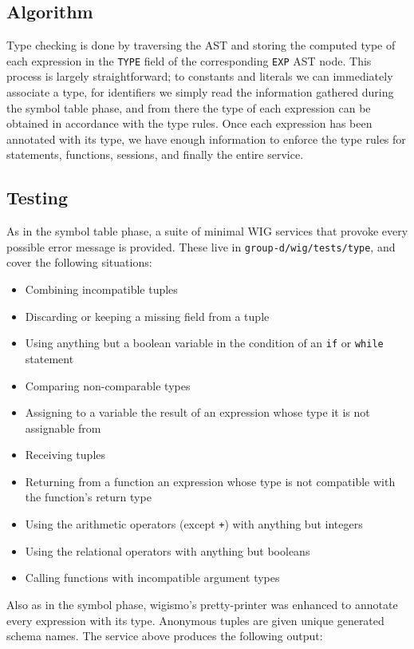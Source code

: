 \documentclass{WigReport}
\begin{document}
\subsection{Algorithm}
Type checking is done by traversing the AST and storing the computed type 
of each expression in the {\tt TYPE} field of the corresponding {\tt EXP}
AST node. This process is largely straightforward; to constants and
literals we can immediately associate a type, for identifiers we simply
read the information gathered during the symbol table phase, and from 
there the type of each expression can be obtained in accordance with the
type rules. Once each expression has been annotated with its type, we have
enough information to enforce the type rules for statements, functions,
sessions, and finally the entire service.

\subsection{Testing}
As in the symbol table phase, a suite of minimal WIG services that provoke
every possible error message is provided. These live in
{\tt group-d/wig/tests/type}, and cover the following situations:

\begin{itemize}
\item Combining incompatible tuples
\item Discarding or keeping a missing field from a tuple
\item Using anything but a boolean variable in the condition of an
      {\tt if} or {\tt while} statement
\item Comparing non-comparable types
\item Assigning to a variable the result of an expression whose type it is
      not assignable from
\item Receiving tuples
\item Returning from a function an expression whose type is not compatible
      with the function's return type
\item Using the arithmetic operators (except {\tt +}) with anything but
      integers
\item Using the relational operators with anything but booleans
\item Calling functions with incompatible argument types
\end{itemize}

Also as in the symbol phase, wigismo's pretty-printer was enhanced to
annotate every expression with its type. Anonymous tuples are given unique
generated schema names. The service above produces the following output:
\end{document}
